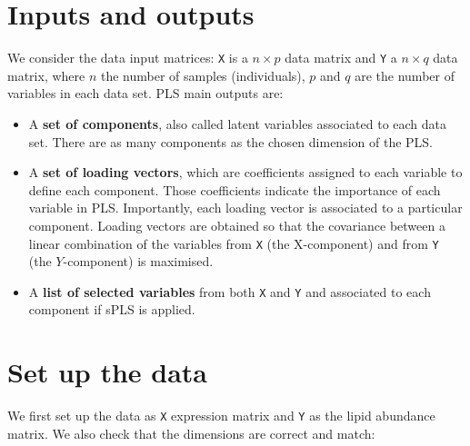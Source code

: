 \documentclass[]{book}
\newenvironment{Shaded}{\begin{snugshade}}{\end{snugshade}}
\newcommand{\KeywordTok}[1]{\textcolor[rgb]{0.13,0.29,0.53}{\textbf{#1}}}
\newcommand{\StringTok}[1]{\textcolor[rgb]{0.31,0.60,0.02}{#1}}
\newcommand{\OperatorTok}[1]{\textcolor[rgb]{0.81,0.36,0.00}{\textbf{#1}}}
\newcommand{\NormalTok}[1]{#1}
\theoremstyle{definition}
\theoremstyle{definition}
\theoremstyle{definition}
\theoremstyle{remark}
\begin{document}
\section{Inputs and outputs}\label{inputs-and-outputs-1}

We consider the data input matrices: \texttt{X} is a \(n \times p\) data
matrix and \texttt{Y} a \(n \times q\) data matrix, where \(n\) the
number of samples (individuals), \(p\) and \(q\) are the number of
variables in each data set. PLS main outputs are:

\begin{itemize}
\item
  A \textbf{set of components}, also called latent variables associated
  to each data set. There are as many components as the chosen dimension
  of the PLS.
\item
  A \textbf{set of loading vectors}, which are coefficients assigned to
  each variable to define each component. Those coefficients indicate
  the importance of each variable in PLS. Importantly, each loading
  vector is associated to a particular component. Loading vectors are
  obtained so that the covariance between a linear combination of the
  variables from \texttt{X} (the X-component) and from \texttt{Y} (the
  \(Y\)-component) is maximised.
\item
  A \textbf{list of selected variables} from both \texttt{X} and
  \texttt{Y} and associated to each component if sPLS is applied.
\end{itemize}

\section{Set up the data}\label{set-up-the-data-1}

We first set up the data as \texttt{X} expression matrix and \texttt{Y}
as the lipid abundance matrix. We also check that the dimensions are
correct and match:

\begin{Shaded}
\end{Shaded}
\end{document}
